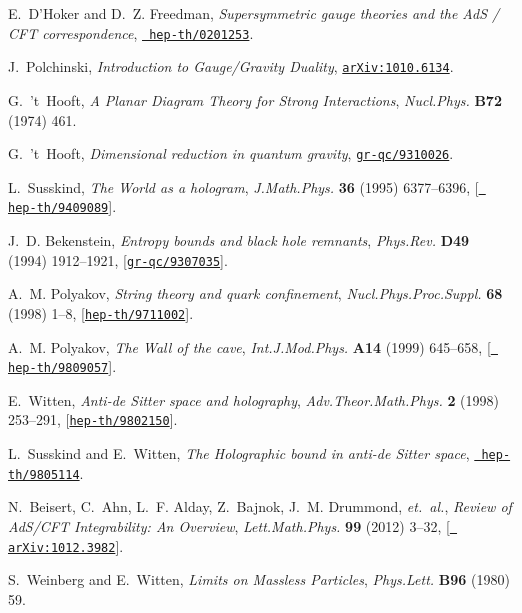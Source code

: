 \documentclass[12pt]{article}
\begin{document}
\begin{thebibliography}{100}
E.~D'Hoker and D.~Z. Freedman, {\it {Supersymmetric gauge theories and the AdS
  / CFT correspondence}},  \href{http://xxx.lanl.gov/abs/hep-th/0201253}{{\tt
  hep-th/0201253}}.

J.~Polchinski, {\it {Introduction to Gauge/Gravity Duality}},
  \href{http://xxx.lanl.gov/abs/1010.6134}{{\tt arXiv:1010.6134}}.

G.~'t~Hooft, {\it {A Planar Diagram Theory for Strong Interactions}},  {\em
  Nucl.Phys.} {\bf B72} (1974) 461.

G.~'t~Hooft, {\it {Dimensional reduction in quantum gravity}},
  \href{http://xxx.lanl.gov/abs/gr-qc/9310026}{{\tt gr-qc/9310026}}.

L.~Susskind, {\it {The World as a hologram}},  {\em J.Math.Phys.} {\bf 36}
  (1995) 6377--6396, [\href{http://xxx.lanl.gov/abs/hep-th/9409089}{{\tt
  hep-th/9409089}}].

J.~D. Bekenstein, {\it {Entropy bounds and black hole remnants}},  {\em
  Phys.Rev.} {\bf D49} (1994) 1912--1921,
  [\href{http://xxx.lanl.gov/abs/gr-qc/9307035}{{\tt gr-qc/9307035}}].

A.~M. Polyakov, {\it {String theory and quark confinement}},  {\em
  Nucl.Phys.Proc.Suppl.} {\bf 68} (1998) 1--8,
  [\href{http://xxx.lanl.gov/abs/hep-th/9711002}{{\tt hep-th/9711002}}].

A.~M. Polyakov, {\it {The Wall of the cave}},  {\em Int.J.Mod.Phys.} {\bf A14}
  (1999) 645--658, [\href{http://xxx.lanl.gov/abs/hep-th/9809057}{{\tt
  hep-th/9809057}}].

E.~Witten, {\it {Anti-de Sitter space and holography}},  {\em
  Adv.Theor.Math.Phys.} {\bf 2} (1998) 253--291,
  [\href{http://xxx.lanl.gov/abs/hep-th/9802150}{{\tt hep-th/9802150}}].

L.~Susskind and E.~Witten, {\it {The Holographic bound in anti-de Sitter
  space}},  \href{http://xxx.lanl.gov/abs/hep-th/9805114}{{\tt
  hep-th/9805114}}.

N.~Beisert, C.~Ahn, L.~F. Alday, Z.~Bajnok, J.~M. Drummond, {\em et.~al.}, {\it
  {Review of AdS/CFT Integrability: An Overview}},  {\em Lett.Math.Phys.} {\bf
  99} (2012) 3--32, [\href{http://xxx.lanl.gov/abs/1012.3982}{{\tt
  arXiv:1012.3982}}].

S.~Weinberg and E.~Witten, {\it {Limits on Massless Particles}},  {\em
  Phys.Lett.} {\bf B96} (1980) 59.


\end{thebibliography}
\end{document}
